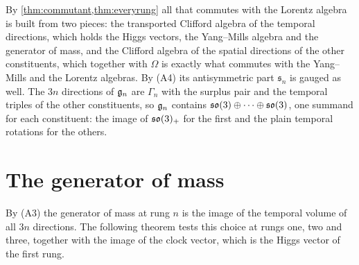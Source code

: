 By \cref{thm:commutant,thm:everyrung} all that commutes with the Lorentz algebra is built from two pieces: the transported Clifford algebra of
the temporal directions, which holds the Higgs vectors, the Yang--Mills algebra and the generator of mass, and the Clifford algebra of the
spatial directions of the other constituents, which together with $\Omega$ is exactly what commutes with the Yang--Mills and the Lorentz
algebras. By (A4) its antisymmetric part $\mathfrak s_n$ is gauged as well. The $3n$ directions of $\mathfrak g_n$ are $\Gamma_n$ with the surplus pair
and the temporal triples of the other constituents, so $\mathfrak g_n$ contains $\mathfrak{so}(3)\oplus\cdots\oplus\mathfrak{so}(3)$, one summand for each constituent: the
image of $\mathfrak{so}(3)_+$ for the first and the plain temporal rotations for the others.

\section{The generator of mass}
\label{sec:test}

By (A3) the generator of mass at rung $n$ is the image of the temporal volume of all $3n$ directions. The following theorem tests this choice
at rungs one, two and three, together with the image of the clock vector, which is the Higgs vector of the first rung.

